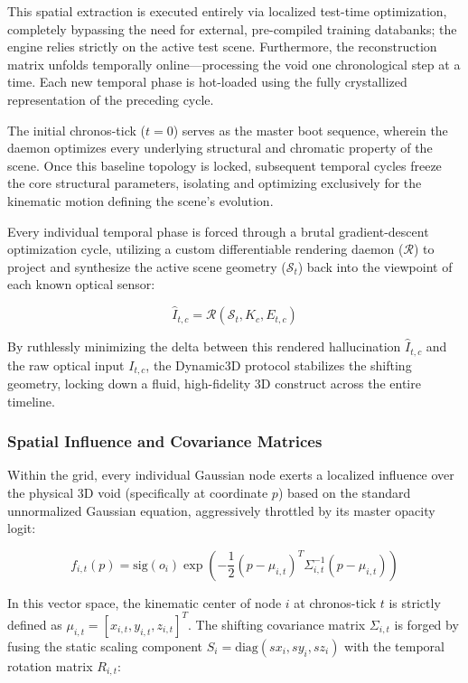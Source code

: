 This spatial extraction is executed entirely via localized test-time optimization, completely bypassing the need for external, pre-compiled training databanks; the engine relies strictly on the active test scene. Furthermore, the reconstruction matrix unfolds temporally online—processing the void one chronological step at a time. Each new temporal phase is hot-loaded using the fully crystallized representation of the preceding cycle. 

The initial chronos-tick ($t=0$) serves as the master boot sequence, wherein the daemon optimizes every underlying structural and chromatic property of the scene. Once this baseline topology is locked, subsequent temporal cycles freeze the core structural parameters, isolating and optimizing exclusively for the kinematic motion defining the scene's evolution.

Every individual temporal phase is forced through a brutal gradient-descent optimization cycle, utilizing a custom differentiable rendering daemon ($\mathcal{R}$) to project and synthesize the active scene geometry ($\mathcal{S}_t$) back into the viewpoint of each known optical sensor:

\begin{equation}
\hat{I}_{t,c} = \mathcal{R}(\mathcal{S}_t, K_c, E_{t,c})
\end{equation}

By ruthlessly minimizing the delta between this rendered hallucination $\hat{I}_{t,c}$ and the raw optical input $I_{t,c}$, the Dynamic3D protocol stabilizes the shifting geometry, locking down a fluid, high-fidelity 3D construct across the entire timeline.


\subsubsection{Spatial Influence and Covariance Matrices}
Within the grid, every individual Gaussian node exerts a localized influence over the physical 3D void (specifically at coordinate $p$) based on the standard unnormalized Gaussian equation, aggressively throttled by its master opacity logit:

\begin{equation}
f_{i,t}(p) = \text{sig}(o_i)\exp \left( -\frac{1}{2} (p - \mu_{i,t})^T \Sigma_{i,t}^{-1} (p - \mu_{i,t}) \right)
\end{equation}

In this vector space, the kinematic center of node $i$ at chronos-tick $t$ is strictly defined as $\mu_{i,t} = [x_{i,t}, y_{i,t}, z_{i,t}]^T$. The shifting covariance matrix $\Sigma_{i,t}$ is forged by fusing the static scaling component $S_i = \text{diag}(sx_i, sy_i, sz_i)$ with the temporal rotation matrix $R_{i,t}$:

